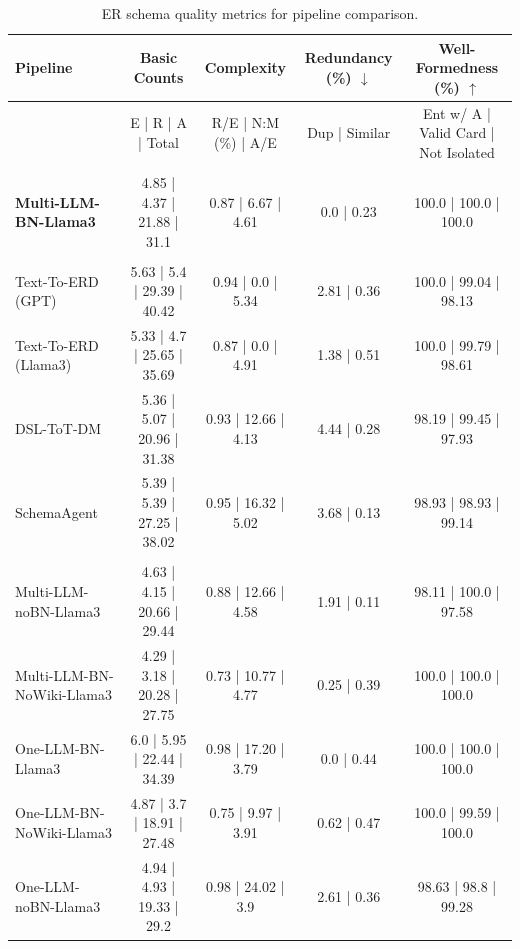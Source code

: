 \begin{table}[t]
\centering
\caption{ER schema quality metrics for pipeline comparison.}
\label{tab:structural_metrics_pipelines}
\scriptsize
\setlength{\tabcolsep}{2.5pt}
\begin{tabular}{lcccc}
\toprule
\textbf{Pipeline}
& \textbf{Basic Counts}
& \textbf{Complexity}
& \textbf{Redundancy (\%)} $\downarrow$
& \textbf{Well-Formedness (\%)} $\uparrow$ \\
\midrule
& E | R | A | Total
& R/E | N:M (\%) | A/E
& Dup | Similar
& Ent w/ A | Valid Card | Not Isolated \\
\rowcolor{gray!15}
\multicolumn{5}{@{}l}{\textit{Our Approach}} \\
\textbf{Multi-LLM-BN-Llama3} & 4.85 | 4.37 | 21.88 | 31.1 & 0.87 | 6.67 | 4.61 & 0.0 | 0.23 & 100.0 | 100.0 | 100.0 \\
\midrule
\rowcolor{gray!15}
\multicolumn{5}{@{}l}{\textit{Baselines}} \\
Text-To-ERD (GPT) ~\cite{menezes2025dbmodeling} & 5.63 | 5.4 | 29.39 | 40.42 & 0.94 | 0.0 | 5.34 & 2.81 | 0.36 & 100.0 | 99.04 | 98.13 \\
Text-To-ERD (Llama3) ~\cite{menezes2025dbmodeling} & 5.33 | 4.7 | 25.65 | 35.69 & 0.87 | 0.0 | 4.91 & 1.38 | 0.51 & 100.0 | 99.79 | 98.61 \\
DSL-ToT-DM~\cite{SilvaEtAl2025_ToT_DomainModeling}  & 5.36 | 5.07 | 20.96 | 31.38 & 0.93 | 12.66 | 4.13 & 4.44 | 0.28 & 98.19 | 99.45 | 97.93 \\
SchemaAgent~\cite{wang2025text2schemafillinggapdesigning} & 5.39 | 5.39 | 27.25 | 38.02 & 0.95 | 16.32 | 5.02 & 3.68 | 0.13 & 98.93 | 98.93 | 99.14 \\
\midrule
\rowcolor{gray!15}
\multicolumn{5}{@{}l}{\textit{Variants}} \\
Multi-LLM-noBN-Llama3 & 4.63 | 4.15 | 20.66 | 29.44 & 0.88 | 12.66 | 4.58 & 1.91 | 0.11 & 98.11 | 100.0 | 97.58 \\
Multi-LLM-BN-NoWiki-Llama3 & 4.29 | 3.18 | 20.28 | 27.75 & 0.73 | 10.77 | 4.77 & 0.25 | 0.39 & 100.0 | 100.0 | 100.0  \\
One-LLM-BN-Llama3 & 6.0 | 5.95 | 22.44 | 34.39 & 0.98 | 17.20 | 3.79 & 0.0 | 0.44 & 100.0 | 100.0 | 100.0 \\
One-LLM-BN-NoWiki-Llama3 & 4.87 | 3.7 | 18.91 | 27.48 & 0.75 | 9.97 | 3.91 & 0.62 | 0.47 & 100.0 | 99.59 | 100.0 \\
One-LLM-noBN-Llama3 & 4.94 | 4.93 | 19.33 | 29.2 & 0.98 | 24.02 | 3.9 & 2.61 | 0.36 & 98.63 | 98.8 | 99.28  \\

\bottomrule
\end{tabular}
\end{table}
